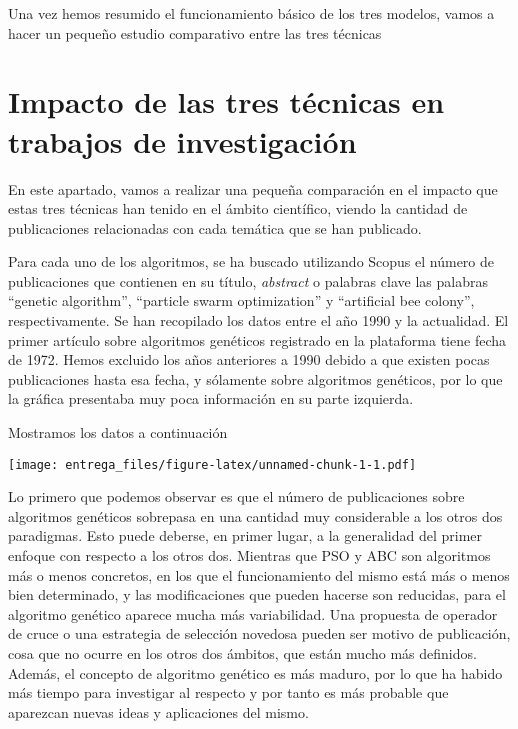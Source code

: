 \documentclass[
  a4paper,
,tablecaptionabove
]{scrartcl}
\begin{document}
Una vez hemos resumido el funcionamiento básico de los tres modelos,
vamos a hacer un pequeño estudio comparativo entre las tres técnicas

\hypertarget{impacto-de-las-tres-tuxe9cnicas-en-trabajos-de-investigaciuxf3n}{%
\section{Impacto de las tres técnicas en trabajos de
investigación}\label{impacto-de-las-tres-tuxe9cnicas-en-trabajos-de-investigaciuxf3n}}

En este apartado, vamos a realizar una pequeña comparación en el impacto
que estas tres técnicas han tenido en el ámbito científico, viendo la
cantidad de publicaciones relacionadas con cada temática que se han
publicado.

Para cada uno de los algoritmos, se ha buscado utilizando Scopus el
número de publicaciones que contienen en su título, \emph{abstract} o
palabras clave las palabras \enquote{genetic algorithm},
\enquote{particle swarm optimization} y \enquote{artificial bee colony},
respectivamente. Se han recopilado los datos entre el año 1990 y la
actualidad. El primer artículo sobre algoritmos genéticos registrado en
la plataforma tiene fecha de 1972. Hemos excluido los años anteriores a
1990 debido a que existen pocas publicaciones hasta esa fecha, y
sólamente sobre algoritmos genéticos, por lo que la gráfica presentaba
muy poca información en su parte izquierda.

Mostramos los datos a continuación

\texttt{[image: entrega\_files/figure-latex/unnamed-chunk-1-1.pdf]}

Lo primero que podemos observar es que el número de publicaciones sobre
algoritmos genéticos sobrepasa en una cantidad muy considerable a los
otros dos paradigmas. Esto puede deberse, en primer lugar, a la
generalidad del primer enfoque con respecto a los otros dos. Mientras
que PSO y ABC son algoritmos más o menos concretos, en los que el
funcionamiento del mismo está más o menos bien determinado, y las
modificaciones que pueden hacerse son reducidas, para el algoritmo
genético aparece mucha más variabilidad. Una propuesta de operador de
cruce o una estrategia de selección novedosa pueden ser motivo de
publicación, cosa que no ocurre en los otros dos ámbitos, que están
mucho más definidos. Además, el concepto de algoritmo genético es más
maduro, por lo que ha habido más tiempo para investigar al respecto y
por tanto es más probable que aparezcan nuevas ideas y aplicaciones del
mismo.
\end{document}
